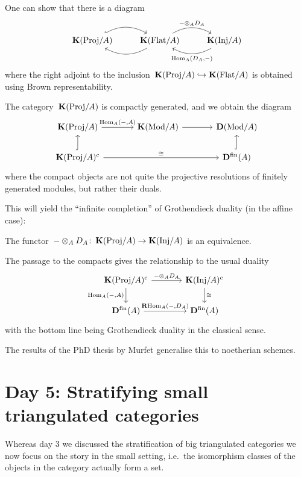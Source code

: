 \documentclass[10pt,a4paper]{article}
\begin{document}
One can show that there is a diagram
\begin{equation}
  \begin{tikzcd}
    \KKK(\mathrm{Proj}/A) \arrow[bend left, hook]{r} & \KKK(\Flat/A) \arrow[bend left]{l} \arrow[bend left]{r}{-\otimes_A D_A} & \KKK(\Inj/A) \arrow[bend left]{l}{\Hom_A(D_A,-)}
  \end{tikzcd}
\end{equation}
where the right adjoint to the inclusion~$\operatorname{\mathbf{K}}(\mathrm{Proj}/A)\hookrightarrow\operatorname{\mathbf{K}}(\mathrm{Flat}/A)$ is obtained using Brown representability.
\begin{proposition}
  The category~$\operatorname{\mathbf{K}}(\mathrm{Proj}/A)$ is compactly generated, and we obtain the diagram
  \begin{equation}
    \begin{tikzcd}[column sep = large]
      \KKK(\mathrm{Proj}/A) \arrow{r}{\Hom_A(-,A)} & \KKK(\Mod/A) \arrow{r} & \derived(\Mod/A) \\
      \KKK(\mathrm{Proj}/A)^\cc \arrow[hook]{u} \arrow{rr}{\cong} & & \derived^\fin(A) \arrow[hook]{u}
    \end{tikzcd}
  \end{equation}
  where the compact objects are not quite the projective resolutions of finitely generated modules, but rather their duals.
\end{proposition}
This will yield the ``infinite completion'' of Grothendieck duality (in the affine case):
\begin{theorem}
  The functor~$-\otimes_AD_A\colon\operatorname{\mathbf{K}}(\mathrm{Proj}/A)\to\operatorname{\mathbf{K}}(\mathrm{Inj}/A)$ is an equivalence.
\end{theorem}
The passage to the compacts gives the relationship to the usual duality
\begin{equation}
  \begin{tikzcd}[column sep = large]
    \KKK(\mathrm{Proj}/A)^\cc \arrow{r}{-\otimes_AD_A} \arrow{d}[swap]{\Hom_A(-,A)} & \KKK(\Inj/A)^\cc \arrow{d}{\cong} \\
    \derived^\fin(A) \arrow{r}{\RRRHom_A(-,D_A)} & \derived^\fin(A)
  \end{tikzcd}
\end{equation}
with the bottom line being Grothendieck duality in the classical sense.

\begin{remark}
  The results of the PhD thesis by Murfet generalise this to noetherian schemes.
\end{remark}


\section{Day 5: Stratifying small triangulated categories}
Whereas day 3 we discussed the stratification of big triangulated categories we now focus on the story in the small setting, i.e.\ the isomorphism classes of the objects in the category actually form a set.
\end{document}
